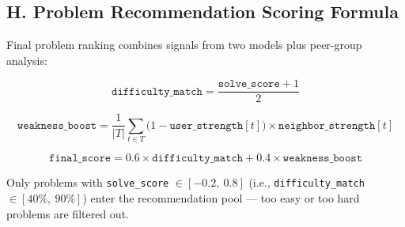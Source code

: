 \documentclass[12pt,a4paper]{article}
\begin{document}
\subsection*{H. Problem Recommendation Scoring Formula}
 
Final problem ranking combines signals from two models plus peer-group analysis:
 
\[
\texttt{difficulty\_match} = \frac{\texttt{solve\_score} + 1}{2}
\]
 
\[
\texttt{weakness\_boost} = \frac{1}{|T|}\sum_{t \in T}
    \bigl(1 - \texttt{user\_strength}[t]\bigr) \times \texttt{neighbor\_strength}[t]
\]
 
\[
\texttt{final\_score} = 0.6 \times \texttt{difficulty\_match}
                      + 0.4 \times \texttt{weakness\_boost}
\]
 
Only problems with \texttt{solve\_score} $\in [-0.2,\ 0.8]$
(i.e., \texttt{difficulty\_match} $\in [40\%,\ 90\%]$) enter the
recommendation pool — too easy or too hard problems are filtered out.




\end{document}

